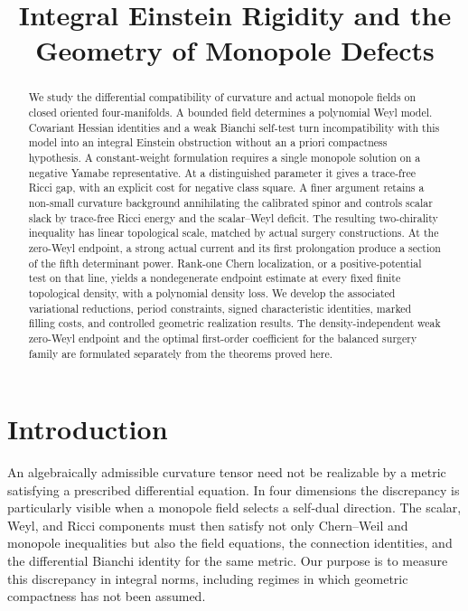 \documentclass[10pt,a4paper]{article}
\title{Integral Einstein Rigidity and the Geometry of Monopole Defects}
\author{}
\date{}
\theoremstyle{definition}
\theoremstyle{remark}
\numberwithin{equation}{section}
\begin{document}
\maketitle
\begin{abstract}
We study the differential compatibility of curvature and actual monopole
fields on closed oriented four-manifolds. A bounded field determines a
polynomial Weyl model. Covariant Hessian identities and a weak Bianchi
self-test turn incompatibility with this model into an integral Einstein
obstruction without an a priori compactness hypothesis. A constant-weight
formulation requires a single monopole solution on a negative Yamabe
representative. At a distinguished parameter it gives a trace-free Ricci
gap, with an explicit cost for negative class square. A finer argument
retains a non-small curvature background annihilating the calibrated
spinor and controls scalar slack by trace-free Ricci energy and the
scalar--Weyl deficit. The resulting two-chirality inequality has linear
topological scale, matched by actual surgery constructions. At the
zero-Weyl endpoint, a strong actual current and its first prolongation
produce a section of the fifth determinant power. Rank-one Chern
localization, or a positive-potential test on that line, yields a
nondegenerate endpoint estimate at every fixed finite topological
density, with a polynomial density loss. We develop
the associated variational reductions, period constraints, signed
characteristic identities, marked filling costs, and controlled geometric
realization results. The density-independent weak zero-Weyl endpoint and the
optimal first-order coefficient for the balanced surgery family are
formulated separately from the theorems proved here.
\end{abstract}
\tableofcontents
\clearpage
\section{Introduction}
\label{sec:introduction}

An algebraically admissible curvature tensor need not be realizable by a
metric satisfying a prescribed differential equation. In four dimensions
the discrepancy is particularly visible when a monopole field selects a
self-dual direction. The scalar, Weyl, and Ricci components must then
satisfy not only Chern--Weil and monopole inequalities but also the field
equations, the connection identities, and the differential Bianchi
identity for the same metric. Our purpose is to measure this discrepancy
in integral norms, including regimes in which geometric compactness has
not been assumed.
\end{document}
